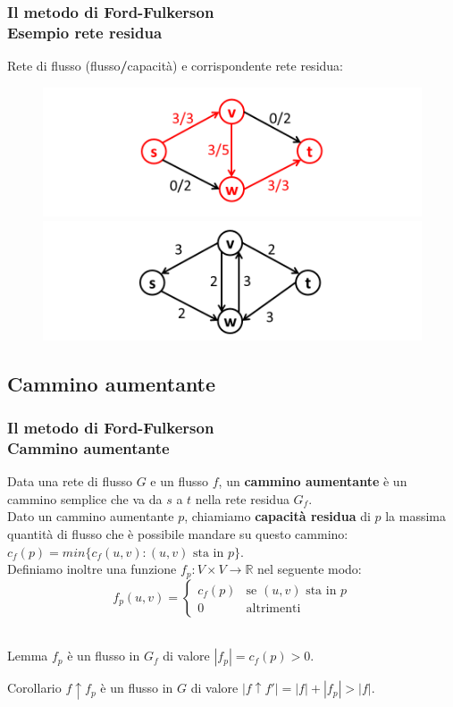 \documentclass{beamer}
\begin{document}
\begin{frame}
\frametitle{Il metodo di Ford-Fulkerson\\Esempio rete residua}
Rete di flusso (flusso\textbf{/}capacità) e corrispondente rete residua:
\begin{figure}
\includegraphics[width=0.8\linewidth]{1.png}\\
\includegraphics[width=0.8\linewidth]{2.png}
\end{figure}
\end{frame}

\subsection{Cammino aumentante}

\begin{frame}
\frametitle{Il metodo di Ford-Fulkerson\\Cammino aumentante}
Data una rete di flusso $G$ e un flusso $f$, un \textbf{cammino aumentante} è un cammino semplice che va da $s$ a $t$ nella rete residua $G_f$.\\
Dato un cammino aumentante $p$, chiamiamo \textbf{capacità residua} di $p$ la massima quantità di flusso che è possibile mandare su questo cammino:\\
$c_f(p)=min\{c_f(u,v):(u,v) \mbox{ sta in } p\}$.\\
Definiamo inoltre una funzione $f_p:V\times V\rightarrow \mathbb{R}$ nel seguente modo:\\
$$f_p(u,v) =
\left\{
	\begin{array}{ll}
		c_f(p) & \mbox{se } (u,v) \mbox{ sta in } p\\
		0 & \mbox{altrimenti}
	\end{array}
\right.$$\\
\begin{block}{Lemma}
$f_p$ è un flusso in $G_f$ di valore $|f_p|=c_f(p)>0$.
\end{block}
\begin{block}{Corollario}
$f\uparrow f_p$ è un flusso in $G$ di valore $|f\uparrow f'|=|f|+|f_p|>|f|.$
\end{block}
\end{frame}
\end{document}
